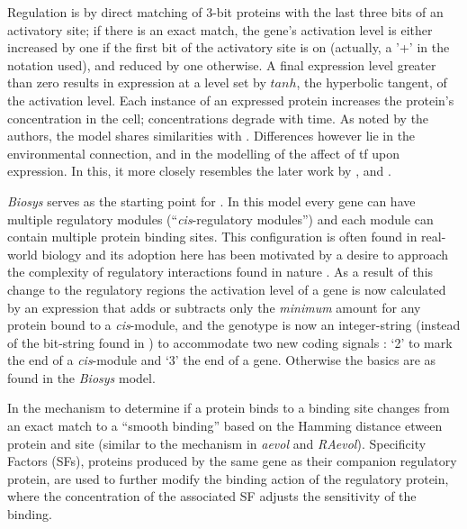 Regulation is by direct matching of 3-bit proteins with the last three bits of an activatory site; if there is an exact
match, the gene's activation level is either increased by one if the first bit of the activatory site is on (actually, a
'+' in the notation used), and reduced by one otherwise. A final expression level greater than zero results in
expression at a level set by $tanh$, the hyperbolic tangent, of the activation level. Each instance of an expressed
protein increases the protein's concentration in the cell; concentrations degrade with time. As noted by the authors,
the model shares similarities with \cite{Reil:1999rp} \parencite[sec. 2.2]{Quick:2003uq}. Differences however lie in
the environmental connection, and in the modelling of the affect of \gls{tf} upon expression. In this, it more closely
resembles the later work by  \cite{Rohlf:2009sh}, \cite{Banzhaf:2003kx} and \cite{Kuo:2006fv}.

\emph{Biosys} serves as the starting point for \cite{Knabe:2006vn}. In this model every gene can have multiple regulatory modules (``\emph{cis}-regulatory modules'') and each module can contain multiple protein binding sites. This configuration is often found in real-world biology and its adoption here has been motivated by a desire to approach the complexity of regulatory interactions found in nature \parencite[pg.16]{Knabe:2006vn}. As a result of this change to the regulatory regions the activation level of a gene is now calculated by an expression that adds or subtracts only the \emph{minimum} amount for any protein bound to a \emph{cis}-module, and the genotype is now an integer-string (instead of the bit-string found in \cite{Quick:2003uq}) to accommodate two new coding signals : `2' to mark the end of a \emph{cis}-module and `3' the end of a gene. Otherwise the basics are as found in the \emph{Biosys} model.

In \cite{Knabe:2008xe} the mechanism to determine if a protein binds to a binding site changes from an exact match to a ``smooth binding'' based on the Hamming distance etween protein and site (similar to the mechanism in \emph{aevol} and \emph{RAevol}). Specificity Factors (SFs), proteins produced by the same gene as their companion regulatory protein, are used to further modify the binding action of the regulatory protein, where the concentration of the associated SF adjusts the sensitivity of the binding.

